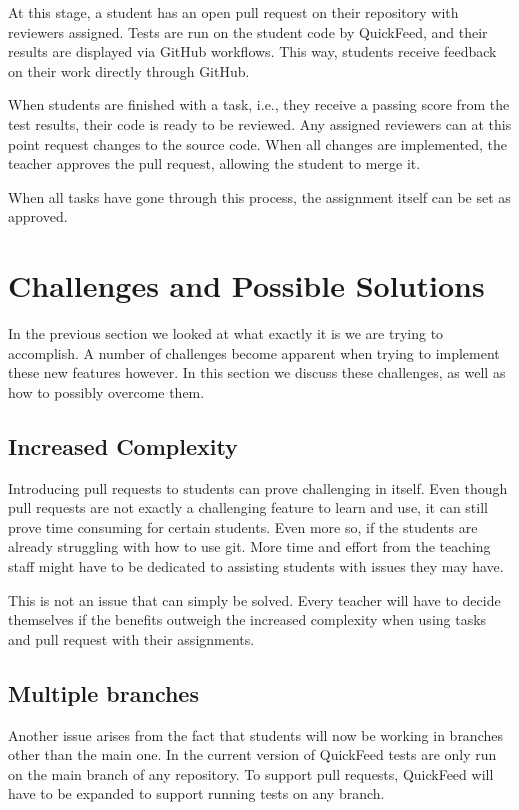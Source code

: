 At this stage, a student has an open pull request on their repository with reviewers assigned.
Tests are run on the student code by QuickFeed, and their results are displayed via GitHub workflows.
This way, students receive feedback on their work directly through GitHub.

When students are finished with a task, i.e., they receive a passing score from the test results, their code is ready to be reviewed.
Any assigned reviewers can at this point request changes to the source code.
When all changes are implemented, the teacher approves the pull request, allowing the student to merge it.

When all tasks have gone through this process, the assignment itself can be set as approved.

\section{Challenges and Possible Solutions}

In the previous section we looked at what exactly it is we are trying to accomplish. 
A number of challenges become apparent when trying to implement these new features however.
In this section we discuss these challenges, as well as how to possibly overcome them.

\subsection{Increased Complexity}

Introducing pull requests to students can prove challenging in itself.
Even though pull requests are not exactly a challenging feature to learn and use, it can still prove time consuming for certain students.
Even more so, if the students are already struggling with how to use git.
More time and effort from the teaching staff might have to be dedicated to assisting students with issues they may have.

This is not an issue that can simply be solved.
Every teacher will have to decide themselves if the benefits outweigh the increased complexity when using tasks and pull request with their assignments.

\subsection{Multiple branches}

Another issue arises from the fact that students will now be working in branches other than the main one.
In the current version of QuickFeed tests are only run on the main branch of any repository.
To support pull requests, QuickFeed will have to be expanded to support running tests on any branch.

